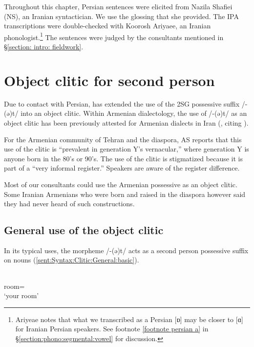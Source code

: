 Throughout this chapter, Persian sentences were elicited from Nazila Shafiei (NS), an Iranian syntactician. We use the glossing that she provided.   The IPA transcriptions were double-checked with     Koorosh Ariyaee, an Iranian phonologist.\footnote{   Ariyeae   notes that what we transcribed as a Persian [ɒ] may be closer to [ɑ] for Iranian Persian speakers. See footnote \ref{footnote persian a} in \S\ref{section:phono:segmental:vowel} for discussion. } The {\seaSEA} sentences were judged by the consultants mentioned in \S\ref{section: intro: fieldwork}. 

\section{Object clitic for second person}\label{section:syntax:clitic}
Due to contact with Persian, {{\iaIA}}   has extended the use of the 2SG possessive suffix /{-(ə)t}/ into an object clitic. Within Armenian dialectology, the use of /{-(ə)t}/ as an object clitic has been previously attested for Armenian dialects in Iran (\citealt[1159]{SayeedVaux-2017-EvolutionArmenian}, citing  \cites[284]{Adjarian-1911-DialectologyBook}[item 675]{MuradyanEtAl-1977-DialectologyBook}[340]{Khurshudian-2020-someAspectsPossessiveMarkersModernArmenian}{Hodgson-202x-GrammaticaliztionDefiniteARticleArmenian}[87]{Martirosyan-2019-Armeniandialects}[\S 4.1]{Vaux-Salmast}). 

For the Armenian community of Tehran and the diaspora, AS reports that this   use of the clitic is ``prevalent in generation Y's vernacular,'' where generation Y is anyone born in the 80’s or 90’s.   The use of the clitic is stigmatized because it is part of a  ``very informal register.''  Speakers are aware of the register difference. 

Most of our consultants could use the Armenian possessive as an object clitic. Some Iranian Armenians who were born and raised in the diaspora however said they had never heard of such constructions. 



\subsection{General use of the object clitic}\label{section:syntax:clitic:general}

In its typical uses, the morpheme /{-(ə)t}/ acts as a second person possessive suffix on nouns (\ref{sent:Syntax:Clitic:General:basic}). 

\begin{exe}
	\ex {}  
	\\
	room={\possSsg}
	\\
	\trans	`your room' \label{sent:Syntax:Clitic:General:basic}
	\\
\end{exe}

